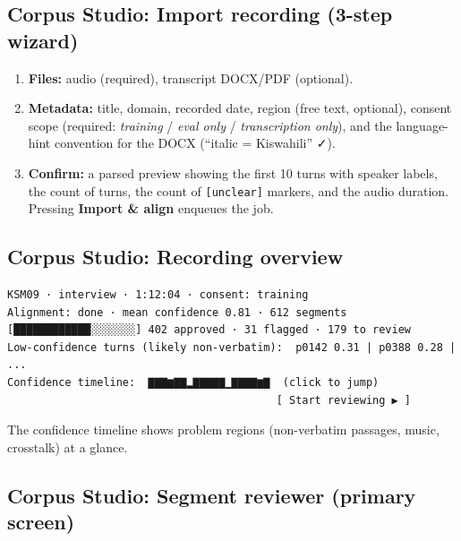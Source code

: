 \documentclass[11pt]{article}
\begin{document}
\hypertarget{corpus-studio-import-recording-3-step-wizard}{%
\subsection{Corpus Studio: Import recording (3-step wizard)}\label{corpus-studio-import-recording-3-step-wizard}}

\begin{enumerate}
\def\labelenumi{\arabic{enumi}.}
\tightlist
\item
  \textbf{Files:} audio (required), transcript DOCX/PDF (optional).
\item
  \textbf{Metadata:} title, domain, recorded date, region (free text, optional), consent scope (required: \emph{training} / \emph{eval only} / \emph{transcription only}), and the language-hint convention for the DOCX (``italic = Kiswahili'' ✓).
\item
  \textbf{Confirm:} a parsed preview showing the first 10 turns with speaker labels, the count of turns, the count of \texttt{[unclear]} markers, and the audio duration. Pressing \textbf{Import \& align} enqueues the job.
\end{enumerate}

\hypertarget{corpus-studio-recording-overview}{%
\subsection{Corpus Studio: Recording overview}\label{corpus-studio-recording-overview}}

\begin{lstlisting}
KSM09 · interview · 1:12:04 · consent: training
Alignment: done · mean confidence 0.81 · 612 segments
[████████████░░░░░░░] 402 approved · 31 flagged · 179 to review
Low-confidence turns (likely non-verbatim):  p0142 0.31 | p0388 0.28 | ...
Confidence timeline:  ▇▇▇▆▇▇▂▇▇▇▇▇▁▇▇▇▇▆▇  (click to jump)
                                          [ Start reviewing ▶ ]
\end{lstlisting}

The confidence timeline shows problem regions (non-verbatim passages, music, crosstalk) at a glance.

\hypertarget{corpus-studio-segment-reviewer-primary-screen}{%
\subsection{Corpus Studio: Segment reviewer (primary screen)}\label{corpus-studio-segment-reviewer-primary-screen}}
\end{document}
